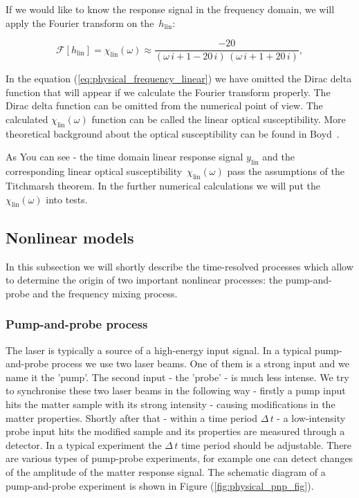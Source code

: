 \documentclass[12pt,twoside,a4paper]{article}
\numberwithin{equation}{subsection}
\numberwithin{figure}{subsection}
\begin{document}
If we would like to know the response signal in the frequency domain, we will apply the Fourier transform on the~$ h_{\text{lin}} $:

\begin{equation} \label{eq:physical_frequency_linear}
  \mathcal{F}[h_{\text{lin}}] = \chi_{\text{lin}}(\omega) \approx \frac{ -20}{(\omega \,i + 1 -20\,i)\,(\omega \,i + 1 + 20\,i)},
\end{equation}

In the equation (\ref{eq:physical_frequency_linear}) we have omitted the Dirac delta function that will appear if we calculate the Fourier
transform properly. The Dirac delta function can be omitted from the numerical point of view. The calculated $ \chi_{\text{lin}}(\omega) $
function can be called the linear optical susceptibility. More theoretical background about the optical susceptibility can be found in
Boyd~\cite{boyd_nlo}. 

As You can see - the time domain linear response signal $ y_{\text{lin}} $ and the corresponding linear optical susceptibility~$
\chi_{\text{lin}}(\omega) $ pass the assumptions of the Titchmarsh theorem. In the further numerical calculations we will put the~$
\chi_{\text{lin}}(\omega) $ into tests. 

\subsection{Nonlinear models} \label{chap:physical_simnlo}

In this subsection we will shortly describe the time-resolved processes which allow to determine the origin of two important nonlinear
processes: the pump-and-probe and the frequency mixing process.

\subsubsection*{Pump-and-probe process} \label{chap:physical_pnp}

The laser is typically a source of a high-energy input signal. In a typical pump-and-probe process we use two laser beams. One of them
is a strong input and we name it the 'pump'. The second input - the 'probe' - is much less intense. We try to synchronise these two
laser beams in the following way - firstly a pump input hits the matter sample with its strong intensity - causing modifications in the matter
properties. Shortly after that - within a time period $\Delta \, t$ - a low-intensity probe input hits the modified sample and its
properties are measured through a detector. In a typical experiment the $\Delta \, t$ time period should be adjustable. There are various types of
pump-probe experiments, for example one can detect changes of the amplitude of the matter response signal. The schematic diagram of a
pump-and-probe experiment is shown in Figure (\ref{fig:physical_pnp_fig}).
\end{document}
